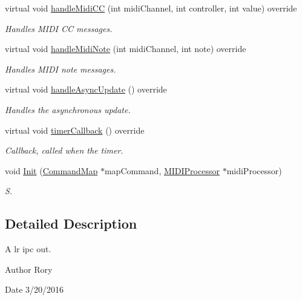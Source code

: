 \begin{DoxyCompactItemize}
virtual void \hyperlink{class_l_r___i_p_c___o_u_t_ad2d2b544157950b3b74ff6f7791c98cc}{handle\+Midi\+CC} (int midi\+Channel, int controller, int value) override
\begin{DoxyCompactList}\small\item\em Handles M\+I\+DI CC messages. \end{DoxyCompactList}\item 
virtual void \hyperlink{class_l_r___i_p_c___o_u_t_ab586f83cf46e3a10ab03a934c749d60d}{handle\+Midi\+Note} (int midi\+Channel, int note) override
\begin{DoxyCompactList}\small\item\em Handles M\+I\+DI note messages. \end{DoxyCompactList}\item 
virtual void \hyperlink{class_l_r___i_p_c___o_u_t_ad51f33b2ec43f590ac2d3fc60c129134}{handle\+Async\+Update} () override
\begin{DoxyCompactList}\small\item\em Handles the asynchronous update. \end{DoxyCompactList}\item 
virtual void \hyperlink{class_l_r___i_p_c___o_u_t_ada29129823f7840fef72598342806f53}{timer\+Callback} () override
\begin{DoxyCompactList}\small\item\em Callback, called when the timer. \end{DoxyCompactList}\item 
void \hyperlink{class_l_r___i_p_c___o_u_t_a06ce5d014521c62f6c9f3505894b8b77}{Init} (\hyperlink{class_command_map}{Command\+Map} $\ast$map\+Command, \hyperlink{class_m_i_d_i_processor}{M\+I\+D\+I\+Processor} $\ast$midi\+Processor)
\begin{DoxyCompactList}\small\item\em S. \end{DoxyCompactList}\end{DoxyCompactItemize}


\subsection{Detailed Description}
A lr ipc out. 

\begin{DoxyAuthor}{Author}
Rory 
\end{DoxyAuthor}
\begin{DoxyDate}{Date}
3/20/2016 
\end{DoxyDate}


